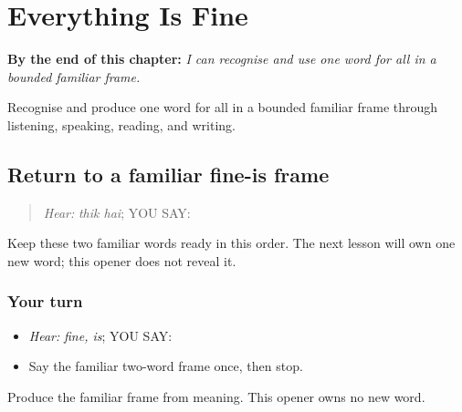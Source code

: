 
\chapter{Everything Is Fine}
\label{ch:pa-a2-sabh}

\begin{chapteropening}
\textbf{By the end of this chapter:} \emph{I can recognise and use one word for all in a bounded familiar frame.}

Recognise and produce one word for all in a bounded familiar frame through listening, speaking, reading, and writing.
\end{chapteropening}

\section[\texorpdfstring{\pa{ਠੀਕ} \pa{ਹੈ} (thik hai)}{ਠੀਕ ਹੈ (thik hai)}]{Return to a familiar fine-is frame}

\label{lesson:PA-C205-fine-return}



\begin{quote}
\emph{Hear:} \emph{thik hai}; YOU SAY: \textbf{ }
\end{quote}

\begin{grammarlens}[title={Grammar Lens}]
Keep these two familiar words ready in this order. The next lesson will own one new word; this opener does not reveal it.
\end{grammarlens}

\subsection*{Your turn}
\begin{itemize}
\raggedright
  \item \emph{Hear:} \emph{fine, is}; YOU SAY: \textbf{ }
  \item Say the familiar two-word frame once, then stop.
\end{itemize}

\begin{tcolorbox}[breakable,colback=teal!4,colframe=teal!35!black,title={Before you move on}]
Produce the familiar frame from meaning. This opener owns no new word.
\end{tcolorbox}
